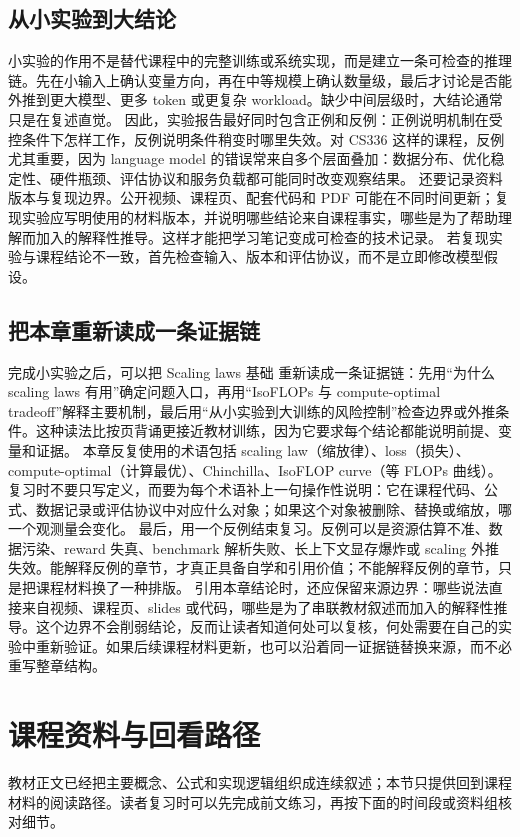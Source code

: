 \documentclass[a4paper]{article}
\begin{document}
\subsection{从小实验到大结论}
小实验的作用不是替代课程中的完整训练或系统实现，而是建立一条可检查的推理链。先在小输入上确认变量方向，再在中等规模上确认数量级，最后才讨论是否能外推到更大模型、更多 token 或更复杂 workload。缺少中间层级时，大结论通常只是在复述直觉。
因此，实验报告最好同时包含正例和反例：正例说明机制在受控条件下怎样工作，反例说明条件稍变时哪里失效。对 CS336 这样的课程，反例尤其重要，因为 language model 的错误常来自多个层面叠加：数据分布、优化稳定性、硬件瓶颈、评估协议和服务负载都可能同时改变观察结果。
还要记录资料版本与复现边界。公开视频、课程页、配套代码和 PDF 可能在不同时间更新；复现实验应写明使用的材料版本，并说明哪些结论来自课程事实，哪些是为了帮助理解而加入的解释性推导。这样才能把学习笔记变成可检查的技术记录。
若复现实验与课程结论不一致，首先检查输入、版本和评估协议，而不是立即修改模型假设。
\subsection{把本章重新读成一条证据链}
完成小实验之后，可以把 Scaling laws 基础 重新读成一条证据链：先用“为什么 scaling laws 有用”确定问题入口，再用“IsoFLOPs 与 compute-optimal tradeoff”解释主要机制，最后用“从小实验到大训练的风险控制”检查边界或外推条件。这种读法比按页背诵更接近教材训练，因为它要求每个结论都能说明前提、变量和证据。
本章反复使用的术语包括 scaling law（缩放律）、loss（损失）、compute-optimal（计算最优）、Chinchilla、IsoFLOP curve（等 FLOPs 曲线）。复习时不要只写定义，而要为每个术语补上一句操作性说明：它在课程代码、公式、数据记录或评估协议中对应什么对象；如果这个对象被删除、替换或缩放，哪一个观测量会变化。
最后，用一个反例结束复习。反例可以是资源估算不准、数据污染、reward 失真、benchmark 解析失败、长上下文显存爆炸或 scaling 外推失效。能解释反例的章节，才真正具备自学和引用价值；不能解释反例的章节，只是把课程材料换了一种排版。
引用本章结论时，还应保留来源边界：哪些说法直接来自视频、课程页、slides 或代码，哪些是为了串联教材叙述而加入的解释性推导。这个边界不会削弱结论，反而让读者知道何处可以复核，何处需要在自己的实验中重新验证。如果后续课程材料更新，也可以沿着同一证据链替换来源，而不必重写整章结构。
\section{课程资料与回看路径}
教材正文已经把主要概念、公式和实现逻辑组织成连续叙述；本节只提供回到课程材料的阅读路径。读者复习时可以先完成前文练习，再按下面的时间段或资料组核对细节。
\end{document}
